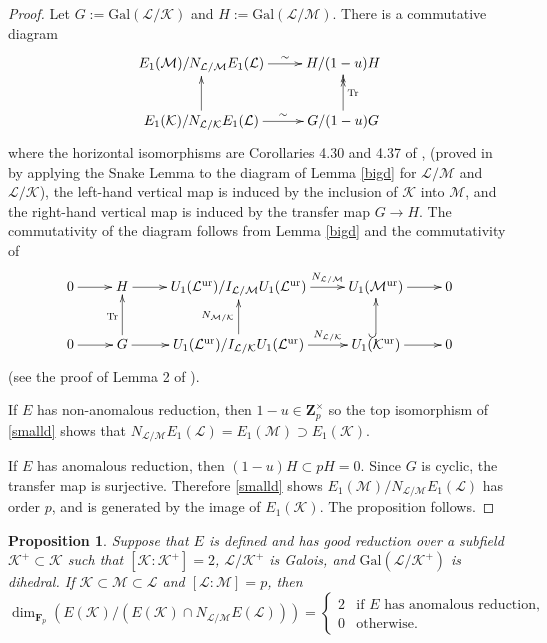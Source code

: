 \documentclass[reqno]{amsart}
\newtheorem{prop}[thm]{Proposition}
\theoremstyle{definition}
\def\Z{\mathbf{Z}}
\def\F{\mathbf{F}}
\def\Zp{\Z_p}
\def\Fp{\F_p}
\def\K{\mathcal{K}}
\def\L{\mathcal{L}}
\def\M{\mathcal{M}}
\def\Gal{\mathrm{Gal}}
\def\unr{\mathrm{ur}}
\def\Tr{\mathrm{Tr}}
\begin{document}
\begin{proof}
Let $G := \Gal(\L/\K)$ and $H := \Gal(\L/\M)$.  
There is a commutative diagram
\begin{equation}
\label{smalld}
\parbox{4in}{
\xymatrix{
E_1(\M)/N_{\L/\M}E_1(\L) \ar^-{\sim}[r] & H/(1-u)H \\
E_1(\K)/N_{\L/\K}E_1(\L) \ar^-{\sim}[r] \ar[u] & G/(1-u)G \ar@{->>}_{\Tr}[u]
}}
\end{equation}
where the horizontal isomorphisms are Corollaries 4.30 and 4.37 of \cite{mazurav}, 
(proved in \cite{luro} by applying the Snake Lemma to the diagram of Lemma
\ref{bigd} for $\L/\M$ and $\L/\K$),
the left-hand vertical map is induced by the 
inclusion of $\K$ into $\M$, and the right-hand vertical map is induced by the 
transfer map $G \to H$.  The commutativity of the diagram follows from 
Lemma \ref{bigd} and the commutativity of 
$$
\xymatrix{
0 \ar[r] & H \ar[r] & U_1(\L^\unr)/I_{\L/\M} U_1(\L^\unr) 
    \ar^-{N_{\L/\M}}[r] & U_1(\M^\unr) \ar[r] & 0 \\
0 \ar[r] & G \ar[r] \ar^{\Tr}[u] & U_1(\L^\unr)/I_{\L/\K} U_1(\L^\unr) 
    \ar^-{N_{\L/\K}}[r]\ar^{N_{\M/\K}}[u] & U_1(\K^\unr) \ar[r]\ar@{^(->}[u] & 0 
}
$$
(see the proof of Lemma 2 of \cite{luro}).

If $E$ has non-anomalous reduction, then $1-u \in \Zp^\times$ 
so the top isomorphism of \eqref{smalld} 
shows that $N_{\L/\M}E_1(\L) = E_1(\M) \supset E_1(\K)$.

If $E$ has anomalous reduction, then $(1-u)H \subset pH = 0$.  
Since $G$ is cyclic, the transfer map is surjective.  
Therefore \eqref{smalld} shows $E_1(\M)/N_{\L/\M}E_1(\L)$ has order $p$, 
and is generated by the image of $E_1(\K)$.  
The proposition follows.
\end{proof}

\begin{prop}
\label{oni}
Suppose that $E$ is defined and has good reduction 
over a subfield $\K^+ \subset \K$ such that $[\K:\K^+] = 2$, 
$\L/\K^+$ is Galois, and $\Gal(\L/\K^+)$ is dihedral.  
If $\K \subset \M \subset \L$ and $[\L:\M] = p$, then 
$$
\dim_{\Fp}(E(\K) / (E(\K) \cap N_{\L/\M}E(\L))) = 
\begin{cases}
2 & \text{if $E$ has anomalous reduction}, \\
0 & \text{otherwise}.
\end{cases}
$$
\end{prop}
\end{document}
